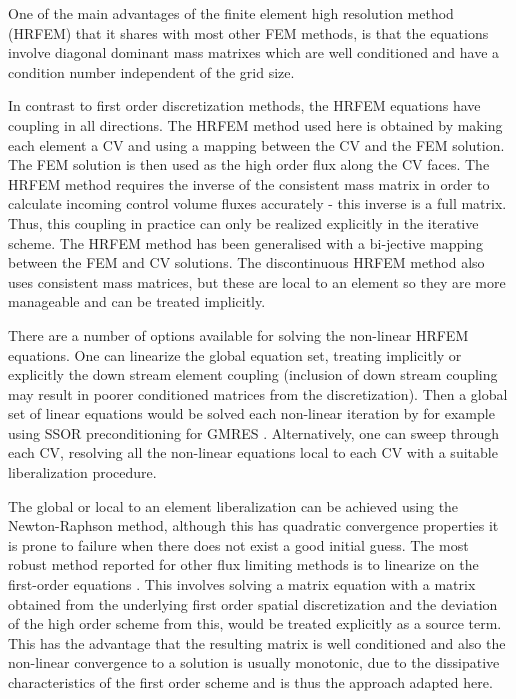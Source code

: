 One of the main advantages of the finite element high resolution method (HRFEM) that it shares with most other FEM methods, is that the equations involve diagonal dominant mass matrixes which are well conditioned and have a condition number independent of the grid size.

In contrast to first order discretization methods, the HRFEM equations have coupling in all directions. The HRFEM method used here is obtained by making each element a CV and using a mapping between the CV and the FEM solution. The FEM solution is then used as the high order flux along the CV faces. The HRFEM method requires the inverse of the consistent mass matrix in order to calculate incoming control volume fluxes accurately - this inverse is a full matrix. Thus, this coupling in practice can only be realized explicitly in the iterative scheme.  The HRFEM method has been generalised with a bi-jective mapping between the FEM and CV solutions. The discontinuous HRFEM method also uses consistent mass matrices, but these are local to an element so they are more manageable and can be treated implicitly.

There are a number of options available for solving the non-linear HRFEM equations. One can linearize the global equation set, treating implicitly or explicitly the down stream element coupling (inclusion of down stream coupling may result in poorer conditioned matrices from the discretization). Then a global set of linear equations would be solved each non-linear iteration by for example using SSOR preconditioning for GMRES \citep{saad_1986}.  Alternatively, one can sweep through each CV, resolving all the non-linear equations local to each CV with a suitable liberalization procedure.

The global or local to an element liberalization can be achieved using the Newton-Raphson method, although this has quadratic convergence properties it is prone to failure when there does not exist a good initial guess. The most robust method reported for other flux limiting methods is to linearize on the first-order equations \citep[see][]{darwish_1993}.  This involves solving a matrix equation with a matrix obtained from the underlying first order spatial discretization and the deviation of the high order scheme from this, would be treated explicitly as a source term. This has the advantage that the resulting matrix is well conditioned and also the non-linear convergence to a solution is usually monotonic, due to the dissipative characteristics of the first order scheme and is thus the approach adapted here.

